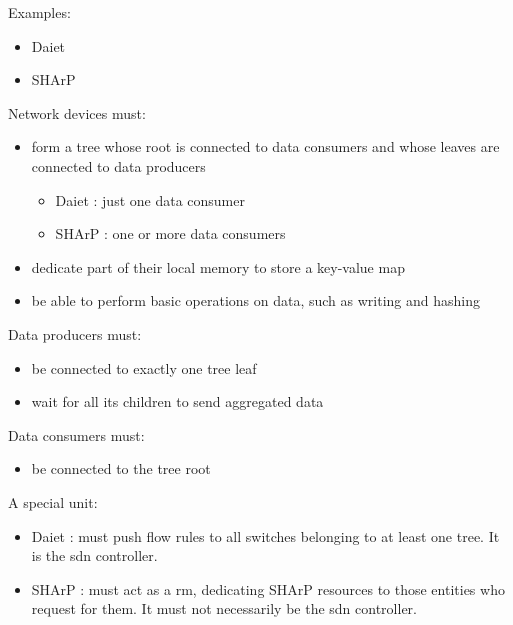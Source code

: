 Examples:
\begin{itemize}
    \item Daiet \cite{daiet}
    \item SHArP \cite{sharp}
\end{itemize}
Network devices must:
\begin{itemize}
    \item form a tree whose root is connected to data consumers and whose leaves are connected to data producers
    \begin{itemize}
        \item Daiet \cite{daiet}: just one data consumer
        \item SHArP \cite{sharp}: one or more data consumers
    \end{itemize}
    \item dedicate part of their local memory to store a key-value map
    \item be able to perform basic operations on data, such as writing and hashing
\end{itemize}
Data producers must:
\begin{itemize}
    \item be connected to exactly one tree leaf
    \item wait for all its children to send aggregated data
\end{itemize}
Data consumers must:
\begin{itemize}
    \item be connected to the tree root
\end{itemize}
A special unit:
\begin{itemize}
    \item Daiet \cite{daiet}: must push flow rules to all switches belonging to at least one tree. It is the \gls{sdn} controller.
    \item SHArP \cite{sharp}: must act as a \gls{rm}, dedicating SHArP \cite{sharp} resources to those entities who request for them. It must not necessarily be the \gls{sdn} controller.
\end{itemize}